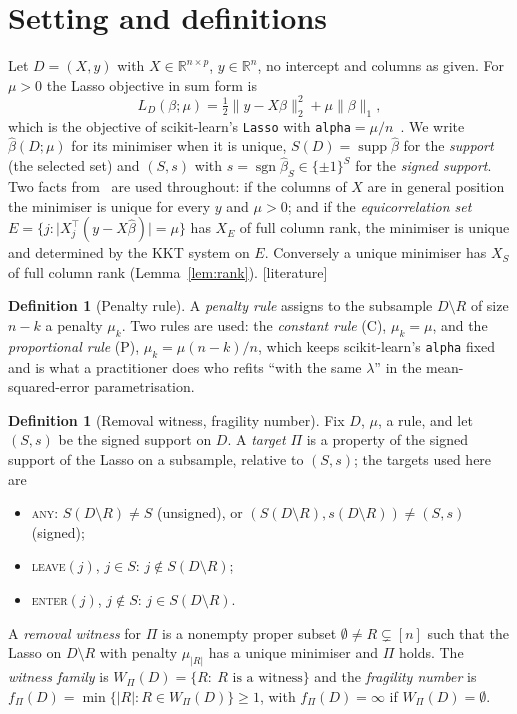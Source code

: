 \documentclass[10pt,a4paper]{article}
\theoremstyle{plain}
\theoremstyle{definition}
\newtheorem{definition}[theorem]{Definition}
\theoremstyle{remark}
\newcommand{\R}{\mathbb{R}}
\newcommand{\supp}{\operatorname{supp}}
\newcommand{\sgn}{\operatorname{sgn}}
\newcommand{\status}[1]{\textnormal{\textsf{\small [#1]}}}
\newcommand{\Dm}{D\setminus R}
\newcommand{\tsc}[1]{\textnormal{\textsc{#1}}}  %
\begin{document}
\section{Setting and definitions}\label{sec:setting}

Let $D=(X,y)$ with $X\in\R^{n\times p}$, $y\in\R^n$, no intercept and columns as given. For $\mu>0$ the Lasso objective in sum form is
\begin{equation}\label{eq:lasso}
L_D(\beta;\mu)=\tfrac12\lVert y-X\beta\rVert_2^2+\mu\lVert\beta\rVert_1 ,
\end{equation}
which is the objective of scikit-learn's \texttt{Lasso} with \texttt{alpha}$=\mu/n$~\citep{pedregosa2011}. We write $\hat\beta(D;\mu)$ for its minimiser when it is unique, $S(D)=\supp\hat\beta$ for the \emph{support} (the selected set) and $(S,s)$ with $s=\sgn\hat\beta_S\in\{\pm1\}^S$ for the \emph{signed support}. Two facts from~\citet{tibshirani2013} are used throughout: if the columns of $X$ are in general position the minimiser is unique for every $y$ and $\mu>0$; and if the \emph{equicorrelation set} $E=\{j:\lvert X_j^{\top}(y-X\hat\beta)\rvert=\mu\}$ has $X_E$ of full column rank, the minimiser is unique and determined by the KKT system on $E$. Conversely a unique minimiser has $X_S$ of full column rank (Lemma~\ref{lem:rank}). \status{literature}

\begin{definition}[Penalty rule]\label{def:rule}
A \emph{penalty rule} assigns to the subsample $\Dm$ of size $n-k$ a penalty $\mu_k$. Two rules are used: the \emph{constant rule} (C), $\mu_k=\mu$, and the \emph{proportional rule} (P), $\mu_k=\mu(n-k)/n$, which keeps scikit-learn's \texttt{alpha} fixed and is what a practitioner does who refits ``with the same $\lambda$'' in the mean-squared-error parametrisation.
\end{definition}

\begin{definition}[Removal witness, fragility number]\label{def:witness}
Fix $D$, $\mu$, a rule, and let $(S,s)$ be the signed support on $D$. A \emph{target} $\Pi$ is a property of the signed support of the Lasso on a subsample, relative to $(S,s)$; the targets used here are
\begin{itemize}[leftmargin=2em,itemsep=1pt]
\item \tsc{any}: $S(\Dm)\neq S$ (unsigned), or $(S(\Dm),s(\Dm))\neq(S,s)$ (signed);
\item \tsc{leave}$(j)$, $j\in S$: $j\notin S(\Dm)$;
\item \tsc{enter}$(j)$, $j\notin S$: $j\in S(\Dm)$.
\end{itemize}
A \emph{removal witness} for $\Pi$ is a nonempty proper subset $\emptyset\neq R\subsetneq[n]$ such that the Lasso on $\Dm$ with penalty $\mu_{|R|}$ has a unique minimiser and $\Pi$ holds. The \emph{witness family} is $W_\Pi(D)=\{R:\ R\text{ is a witness}\}$ and the \emph{fragility number} is $f_\Pi(D)=\min\{|R|:R\in W_\Pi(D)\}\ge1$, with $f_\Pi(D)=\infty$ if $W_\Pi(D)=\emptyset$.
\end{definition}
\end{document}

